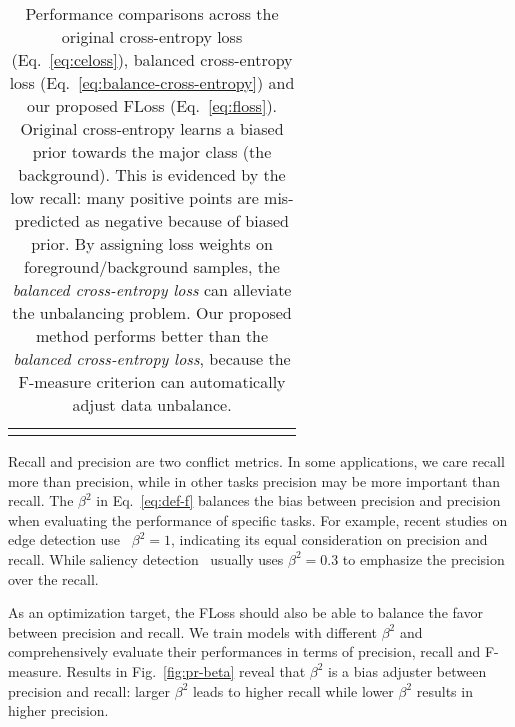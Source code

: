 \documentclass[10pt,twocolumn,letterpaper]{article}
\newcommand{\CheckRmv}[1]{}
\newcommand{\CheckRmv}[1]{#1}
\begin{document}
{\begin{table*}[t]
{\begin{tabular}{lcc|ccc|ccc|ccc|ccc|ccc}
  \bottomrule[1pt]
  \vspace{0pt}
  \end{tabular}
  }
  \vspace{-2pt}
  \caption{Performance comparisons across the original cross-entropy loss (Eq.~\ref{eq:celoss}),
  balanced cross-entropy loss (Eq.~\ref{eq:balance-cross-entropy}) and
  our proposed FLoss (Eq.~\ref{eq:floss}).
  Original cross-entropy learns a biased prior towards the major class (the background).
  This is evidenced by the low recall: many positive points
  are mis-predicted as negative because of biased prior.
  By assigning loss weights on foreground/background samples,
  the \emph{balanced cross-entropy loss} can alleviate the unbalancing problem.
  Our proposed method performs better than the \emph{balanced cross-entropy loss},
  because the F-measure criterion can automatically adjust data unbalance.
  }
    \vspace{-5pt}
  \label{tab:balance}
\end{table*}
}

Recall and precision are two conflict metrics.
%
In some applications, we care recall more than precision,
while in other tasks precision may be more important than recall.
%
The $\beta^2$ in Eq.~\ref{eq:def-f} balances the bias between precision and precision
when evaluating the performance of specific tasks.
%
For example, recent studies on edge detection
use~\cite{bsds500, xie2015holistically, shen2015deepcontour} $\beta^2=1$,
indicating its equal consideration on precision and recall.
%
While saliency detection~\cite{achanta2009frequency, hou2017deeply, li2016deep, liu2016dhsnet, wang2016saliency} usually uses $\beta^2=0.3$
to emphasize the precision over the recall.

As an optimization target, the FLoss should also be able to 
balance the favor between precision and recall.
%
We train models with different $\beta^2$ and comprehensively evaluate 
their performances in terms of precision, recall and F-measure.
%
Results in Fig.~\ref{fig:pr-beta} reveal that $\beta^2$ is a bias adjuster 
between precision and recall: %
larger $\beta^2$ leads to higher recall while lower $\beta^2$ results in higher precision.

\CheckRmv{
\begin{figure}[!htb]
  \centering
  \texttt{[image: figures/pr-beta]}
  \caption{{\color{red}{\textbf{Precision}}}, {\color{green}{\textbf{Recall}}},
    {\color{blue}{\textbf{F-measure}}} of model trained under different $\beta^2$
    (Eq.~\ref{eq:def-f}).
    The precision decreases with the growing of $\beta^2$ whereas recall increases.
    This characteristic gives us much flexibility to adjust the balance 
    between recall and precision:
    use larger $\beta^2$ in a recall-first application and lower $\beta^2$ 
    otherwise.
  }\label{fig:pr-beta}\vspace{-12pt}
\end{figure}
}
\end{document}
